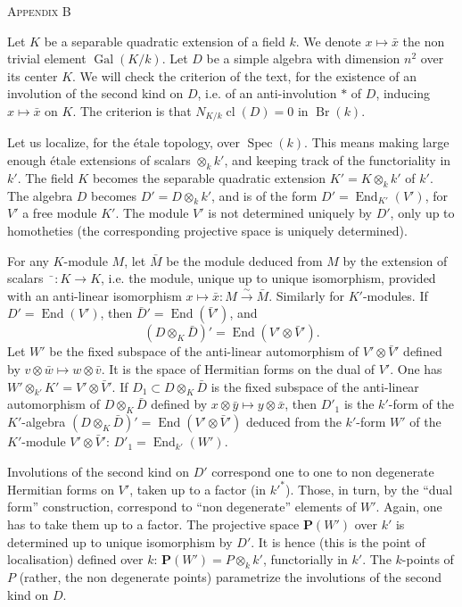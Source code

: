 \documentclass[10pt,a4paper]{article}
\DeclareMathOperator{\Gal}{Gal}
\DeclareMathOperator{\End}{End}
\DeclareMathOperator{\Br}{Br}
\DeclareMathOperator{\Spec}{Spec}
\DeclareMathOperator{\cl}{cl}
\newcommand{\AppendixHeading}[1]{\par\vspace{1.2em}\begin{center}\textsc{Appendix #1}\end{center}\vspace{0.6em}\par}
\begin{document}
\newpage
\AppendixHeading{B}
Let $K$ be a separable quadratic extension of a field $k$. We denote $x\mapsto\bar{x}$
the non trivial element $\Gal(K/k)$. Let $D$ be a simple algebra with dimension
$n^2$ over its center $K$. We will check the criterion of the text, for the existence
of an involution of the second kind on $D$, i.e. of an anti-involution $*$ of $D$,
inducing $x\mapsto\bar{x}$ on $K$. The criterion is that $N_{K/k}\cl(D)=0$ in $\Br(k)$.

Let us localize, for the étale topology, over $\Spec(k)$. This means making
large enough étale extensions of scalars $\otimes_k k'$, and keeping track of the
functoriality in $k'$. The field $K$ becomes the separable quadratic extension
$K'=K\otimes_k k'$ of $k'$. The algebra $D$ becomes $D'=D\otimes_k k'$, and is of the form
$D'=\End_{K'}(V')$, for $V'$ a free module $K'$. The module $V'$ is not determined
uniquely by $D'$, only up to homotheties (the corresponding projective space is
uniquely determined).

For any $K$-module $M$, let $\bar{M}$ be the module deduced from $M$ by the
extension of scalars $\bar{\phantom{x}}:K\to K$, i.e. the module, unique up to unique
isomorphism, provided with an anti-linear isomorphism $x\mapsto\bar{x}:M\xrightarrow{\sim}\bar{M}$.
Similarly for $K'$-modules. If $D'=\End(V')$, then $\bar{D}{}'=\End(\bar{V}{}')$, and
\[
(D\otimes_K\bar{D})'=\End(V'\otimes\bar{V}{}').
\]
Let $W'$ be the fixed subspace of the anti-linear automorphism of $V'\otimes\bar{V}{}'$
defined by $v\otimes\bar{w}\mapsto w\otimes\bar{v}$. It is the space of Hermitian forms on the dual of
$V'$. One has $W'\otimes_{k'}K'=V'\otimes\bar{V}{}'$. If $D_1\subset D\otimes_K\bar{D}$ is the fixed subspace
of the anti-linear automorphism of $D\otimes_K\bar{D}$ defined by $x\otimes\bar{y}\mapsto y\otimes\bar{x}$, then
$D'_1$ is the $k'$-form of the $K'$-algebra $(D\otimes_K\bar{D})'=\End(V'\otimes\bar{V}{}')$ deduced from
the $k'$-form $W'$ of the $K'$-module $V'\otimes\bar{V}{}'$: $D'_1=\End_{k'}(W')$.

Involutions of the second kind on $D'$ correspond one to one to non
degenerate Hermitian forms on $V'$, taken up to a factor (in $k'^*$). Those, in turn,
by the ``dual form'' construction, correspond to ``non degenerate'' elements of
$W'$. Again, one has to take them up to a factor. The projective space $\mathbf{P}(W')$
over $k'$ is determined up to unique isomorphism by $D'$. It is hence (this is the
point of localisation) defined over $k$: $\mathbf{P}(W')=P\otimes_k k'$, functorially in $k'$. The
$k$-points of $P$ (rather, the non degenerate points) parametrize the involutions
of the second kind on $D$.
\end{document}
